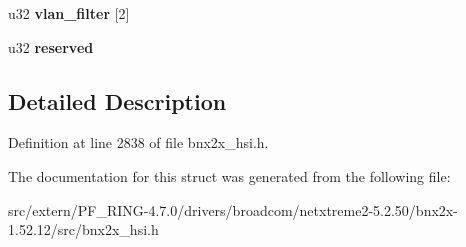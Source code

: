 \begin{DoxyCompactItemize}
\item 
\hypertarget{structtstorm__eth__mac__filter__config_ac57218a453b709e3af9ae141ae85face}{
u32 {\bfseries vlan\_\-filter} \mbox{[}2\mbox{]}}
\label{structtstorm__eth__mac__filter__config_ac57218a453b709e3af9ae141ae85face}

\item 
\hypertarget{structtstorm__eth__mac__filter__config_a115ed3ef553b1780f5fff1998d85a959}{
u32 {\bfseries reserved}}
\label{structtstorm__eth__mac__filter__config_a115ed3ef553b1780f5fff1998d85a959}

\end{DoxyCompactItemize}


\subsection{Detailed Description}


Definition at line 2838 of file bnx2x\_\-hsi.h.



The documentation for this struct was generated from the following file:\begin{DoxyCompactItemize}
\item 
src/extern/PF\_\-RING-\/4.7.0/drivers/broadcom/netxtreme2-\/5.2.50/bnx2x-\/1.52.12/src/bnx2x\_\-hsi.h\end{DoxyCompactItemize}
